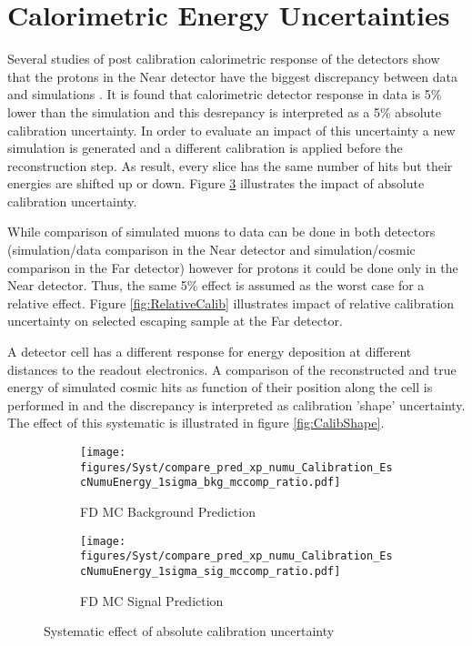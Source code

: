\section{Calorimetric Energy Uncertainties}
Several studies of post calibration calorimetric response of the detectors show that the protons in the Near detector
have the biggest discrepancy between data and simulations \cite{ecalib_talk}. It is found that calorimetric detector
response in data is 5\% lower than the simulation and this desrepancy is interpreted as a 5\% absolute calibration
uncertainty. In order to evaluate an impact of this uncertainty a new simulation is generated and a different calibration
is applied before the reconstruction step. As result, every slice has the same number of hits but their energies are 
shifted up or down. Figure \ref{fig:Calibration} illustrates the impact of absolute calibration uncertainty.

While comparison of simulated muons to data can be done in both detectors (simulation/data comparison in the Near detector 
and simulation/cosmic comparison in the Far detector) however for protons it could be done only in the Near detector.  
Thus, the same 5\% effect is assumed as the worst case for a relative effect. Figure \ref{fig:RelativeCalib} illustrates 
impact of relative calibration uncertainty on selected escaping sample at the Far detector. 

A detector cell has a different response for energy deposition at different distances to the readout electronics. 
A comparison of the reconstructed and true energy of simulated cosmic hits as function of their position along the cell 
is performed in \cite{shape_talk} and the discrepancy is interpreted as calibration 'shape' uncertainty. The effect of this 
systematic is illustrated in figure \ref{fig:CalibShape}.  

\clearpage
\begin{figure}[t!]
\begin{subfigure}[t]{0.5\textwidth}
  \centering
  \texttt{[image: figures/Syst/compare\_pred\_xp\_numu\_Calibration\_EscNumuEnergy\_1sigma\_bkg\_mccomp\_ratio.pdf]}
  \caption{FD MC Background Prediction}
  \label{fig:bkg_Calibration}
\end{subfigure}%
\begin{subfigure}[t]{0.5\textwidth}
  \centering
  \texttt{[image: figures/Syst/compare\_pred\_xp\_numu\_Calibration\_EscNumuEnergy\_1sigma\_sig\_mccomp\_ratio.pdf]}
  \caption{FD MC Signal Prediction}
  \label{fig:sig_Calibration}
\end{subfigure}
\caption{ Systematic effect of absolute calibration uncertainty }
\label{fig:Calibration}
\end{figure}

